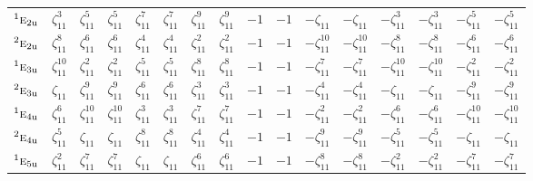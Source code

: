 \documentclass[10pt,a4paper]{article}
\numberwithin{equation}{section}
\newcommand{\irr}[1]{\text{\normalfont\scshape #1}}
\newcommand{\conjpair}[1]{{}^{#1}}
\newcommand{\ptag}[1]{\mathrm{#1}}
\newcommand{\rootunity}[1]{\zeta_{#1}}
\begin{document}
{\begin{longtable}{@{}lccccccccccccccc@{}}
$\conjpair{1}\irr{e}_{2\ptag{u}}$ & $\rootunity{11}^{3}$ & $\rootunity{11}^{5}$ & $\rootunity{11}^{5}$ & $\rootunity{11}^{7}$ & $\rootunity{11}^{7}$ & $\rootunity{11}^{9}$ & $\rootunity{11}^{9}$ & $-1$ & $-1$ & $-\rootunity{11}$ & $-\rootunity{11}$ & $-\rootunity{11}^{3}$ & $-\rootunity{11}^{3}$ & $-\rootunity{11}^{5}$ & $-\rootunity{11}^{5}$\\
$\conjpair{2}\irr{e}_{2\ptag{u}}$ & $\rootunity{11}^{8}$ & $\rootunity{11}^{6}$ & $\rootunity{11}^{6}$ & $\rootunity{11}^{4}$ & $\rootunity{11}^{4}$ & $\rootunity{11}^{2}$ & $\rootunity{11}^{2}$ & $-1$ & $-1$ & $-\rootunity{11}^{10}$ & $-\rootunity{11}^{10}$ & $-\rootunity{11}^{8}$ & $-\rootunity{11}^{8}$ & $-\rootunity{11}^{6}$ & $-\rootunity{11}^{6}$\\
$\conjpair{1}\irr{e}_{3\ptag{u}}$ & $\rootunity{11}^{10}$ & $\rootunity{11}^{2}$ & $\rootunity{11}^{2}$ & $\rootunity{11}^{5}$ & $\rootunity{11}^{5}$ & $\rootunity{11}^{8}$ & $\rootunity{11}^{8}$ & $-1$ & $-1$ & $-\rootunity{11}^{7}$ & $-\rootunity{11}^{7}$ & $-\rootunity{11}^{10}$ & $-\rootunity{11}^{10}$ & $-\rootunity{11}^{2}$ & $-\rootunity{11}^{2}$\\
$\conjpair{2}\irr{e}_{3\ptag{u}}$ & $\rootunity{11}$ & $\rootunity{11}^{9}$ & $\rootunity{11}^{9}$ & $\rootunity{11}^{6}$ & $\rootunity{11}^{6}$ & $\rootunity{11}^{3}$ & $\rootunity{11}^{3}$ & $-1$ & $-1$ & $-\rootunity{11}^{4}$ & $-\rootunity{11}^{4}$ & $-\rootunity{11}$ & $-\rootunity{11}$ & $-\rootunity{11}^{9}$ & $-\rootunity{11}^{9}$\\
$\conjpair{1}\irr{e}_{4\ptag{u}}$ & $\rootunity{11}^{6}$ & $\rootunity{11}^{10}$ & $\rootunity{11}^{10}$ & $\rootunity{11}^{3}$ & $\rootunity{11}^{3}$ & $\rootunity{11}^{7}$ & $\rootunity{11}^{7}$ & $-1$ & $-1$ & $-\rootunity{11}^{2}$ & $-\rootunity{11}^{2}$ & $-\rootunity{11}^{6}$ & $-\rootunity{11}^{6}$ & $-\rootunity{11}^{10}$ & $-\rootunity{11}^{10}$\\
$\conjpair{2}\irr{e}_{4\ptag{u}}$ & $\rootunity{11}^{5}$ & $\rootunity{11}$ & $\rootunity{11}$ & $\rootunity{11}^{8}$ & $\rootunity{11}^{8}$ & $\rootunity{11}^{4}$ & $\rootunity{11}^{4}$ & $-1$ & $-1$ & $-\rootunity{11}^{9}$ & $-\rootunity{11}^{9}$ & $-\rootunity{11}^{5}$ & $-\rootunity{11}^{5}$ & $-\rootunity{11}$ & $-\rootunity{11}$\\
$\conjpair{1}\irr{e}_{5\ptag{u}}$ & $\rootunity{11}^{2}$ & $\rootunity{11}^{7}$ & $\rootunity{11}^{7}$ & $\rootunity{11}$ & $\rootunity{11}$ & $\rootunity{11}^{6}$ & $\rootunity{11}^{6}$ & $-1$ & $-1$ & $-\rootunity{11}^{8}$ & $-\rootunity{11}^{8}$ & $-\rootunity{11}^{2}$ & $-\rootunity{11}^{2}$ & $-\rootunity{11}^{7}$ & $-\rootunity{11}^{7}$\\

\end{longtable}}
\end{document}
